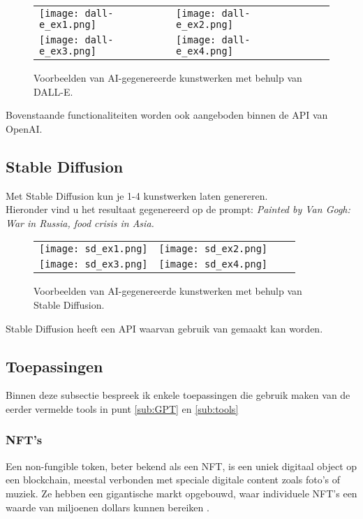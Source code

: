 \begin{figure}[h!]
    \centering
    \begin{tabular}{llll}
        \texttt{[image: dall-e\_ex1.png]} &
        \texttt{[image: dall-e\_ex2.png]} \\
        \texttt{[image: dall-e\_ex3.png]} &
        \texttt{[image: dall-e\_ex4.png]}
    \end{tabular}
    \caption{Voorbeelden van AI-gegenereerde kunstwerken met behulp van DALL-E.}
    \label{fig:examples}
\end{figure}


 Bovenstaande functionaliteiten worden ook aangeboden binnen de API van OpenAI.
\pagebreak

\subsection{Stable Diffusion}
Met Stable Diffusion kun je 1-4 kunstwerken laten genereren. \\

Hieronder vind u het resultaat gegenereerd op de prompt:  \emph{Painted by Van Gogh: War in Russia, food crisis in Asia.}

\begin{figure}[h!]
    \centering
    \begin{tabular}{llll}
        \texttt{[image: sd\_ex1.png]} &
        \texttt{[image: sd\_ex2.png]} \\
        \texttt{[image: sd\_ex3.png]} &
        \texttt{[image: sd\_ex4.png]}
    \end{tabular}
    \caption{Voorbeelden van AI-gegenereerde kunstwerken met behulp van Stable Diffusion.}
    \label{fig:examples}
\end{figure}

Stable Diffusion heeft een API waarvan gebruik van gemaakt kan worden. \\

\pagebreak

\subsection{Toepassingen}
Binnen deze subsectie bespreek ik enkele toepassingen die gebruik maken van de eerder vermelde tools in punt \ref{sub:GPT} en \ref{sub:tools}

\subsubsection{NFT's}
Een non-fungible token, beter bekend als een NFT, is een uniek digitaal object op een blockchain, meestal verbonden met speciale digitale content zoals foto's of muziek. Ze hebben een gigantische markt opgebouwd, waar individuele NFT's een waarde van miljoenen dollars kunnen bereiken \autocite{nft_whatisit}. \\

